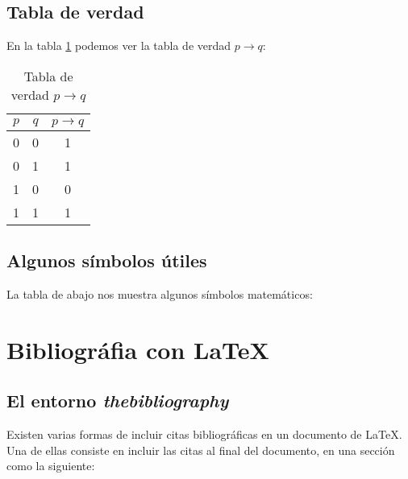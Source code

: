 \documentclass[letterpaper,12pt]{book}
\begin{document}
\section{Tabla de verdad}

En la tabla \ref{tab:cap8t1} podemos ver la tabla de verdad $p \rightarrow q$:

\begin{table}[ht]
	\caption{Tabla de verdad $p \rightarrow q$}
	\begin{center}
		\begin{tabular}{|c|c|c|} \hline
			$p$ & $q$ & $p \rightarrow q$\\\hline
			0 & 0 & 1 \\
			0 & 1 & 1 \\
			1 & 0 & 0 \\
			1 & 1 & 1 \\\hline
		\end{tabular}
	\end{center}
	\label{tab:cap8t1}
\end{table}

\section{Algunos símbolos útiles}

La tabla de abajo nos muestra algunos símbolos matemáticos:



\appendix
\chapter{Bibliográfia con \LaTeX{}}

\section{El entorno \textit{thebibliography}}

Existen varias formas de incluir citas bibliográficas en un 
documento de \LaTeX{}. Una de ellas consiste en incluir las
citas al final del documento, en una sección como la siguiente:
\end{document}
